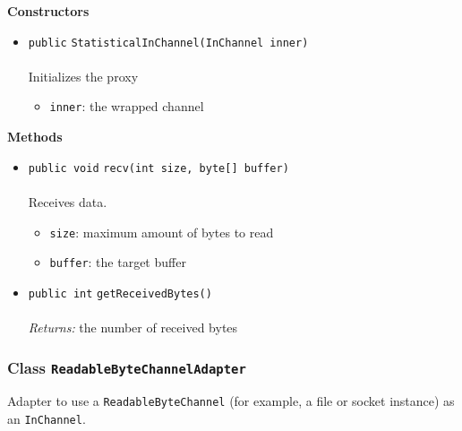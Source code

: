 \textbf{\sffamily Constructors}
\begin{itemize}
\item \lstinline|public| \lstinline|StatisticalInChannel|\lstinline|(InChannel inner)|\\ \\[-0.6em]
Initializes the proxy
\begin{itemize}
\item \lstinline|inner|: the wrapped channel
\end{itemize}



\end{itemize}


\textbf{\sffamily Methods}
\begin{itemize}
\item \lstinline|public void| \lstinline|recv|\lstinline|(int size, byte[] buffer)|\\ \\[-0.6em]
Receives data.
\begin{itemize}
\item \lstinline|size|: maximum amount of bytes to read
\item \lstinline|buffer|: the target buffer
\end{itemize}



\item \lstinline|public int| \lstinline|getReceivedBytes|\lstinline|()|\\ \\[-0.6em]
\emph{Returns:} the number of received bytes



\end{itemize}

\subsubsection{Class \lstinline|ReadableByteChannelAdapter|}
Adapter to use a \lstinline|ReadableByteChannel| (for example, a file or socket instance) as an
 \lstinline|InChannel|. \\
\noindent\begin{minipage}[t]{5cm}
\vspace{0.3em}
\hspace*{2em}
\vspace{0.3em}
\end{minipage}



